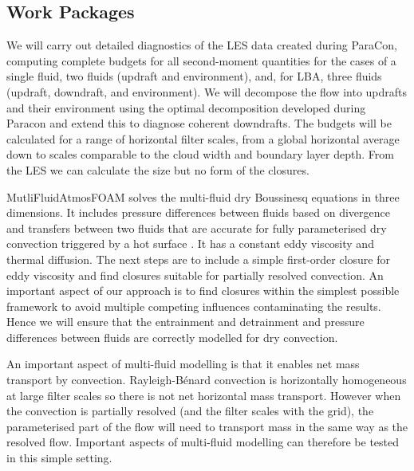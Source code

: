 \documentclass[11pt,a4paper]{article}
\begin{document}
\subsection{Work Packages}
\label{sec:WPs}


We will carry out detailed diagnostics of the LES data created during ParaCon, computing complete budgets for all second-moment quantities for the cases of a single fluid, two fluids (updraft and environment), and, for LBA, three fluids (updraft, downdraft, and environment).
We will decompose the flow into updrafts and their environment using the optimal decomposition developed during Paracon and extend this to diagnose coherent downdrafts. The budgets will be calculated for a range of horizontal filter scales, from a global horizontal average down to scales comparable to the cloud width and boundary layer depth. From the LES we can calculate the size but no form of the closures.


MutliFluidAtmosFOAM solves the multi-fluid dry Boussinesq equations in three dimensions. It includes pressure differences between fluids based on divergence and transfers between two fluids that are accurate for fully parameterised dry convection triggered by a hot surface \cite[]{WMS20}. It has a constant eddy viscosity and thermal diffusion. The next steps are to include a simple first-order closure for eddy viscosity and find closures suitable for partially resolved convection. An important aspect of our approach is to find closures within the simplest possible framework to avoid multiple competing influences contaminating the results. Hence we will ensure that the entrainment and detrainment and pressure differences between fluids are correctly modelled for dry convection. 

An important aspect of multi-fluid modelling is that it enables net mass transport by convection. Rayleigh-B\'enard convection is horizontally homogeneous at large filter scales so there is not net horizontal mass transport. However when the convection is partially resolved (and the filter scales with the grid), the parameterised part of the flow will need to transport mass in the same way as the resolved flow. Important aspects of multi-fluid modelling can therefore be tested in this simple setting.
\end{document}
